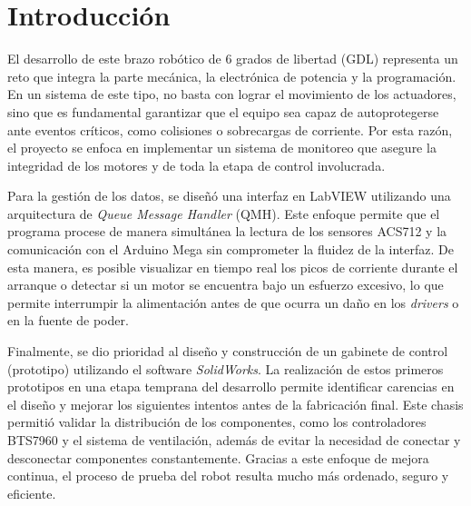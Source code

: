 \chapter{Introducción}
\lineaLateral

El desarrollo de este brazo robótico de 6 grados de libertad (GDL) representa un reto que integra la parte mecánica, la electrónica de potencia y la programación. En un sistema de este tipo, no basta con lograr el movimiento de los actuadores, sino que es fundamental garantizar que el equipo sea capaz de autoprotegerse ante eventos críticos, como colisiones o sobrecargas de corriente. Por esta razón, el proyecto se enfoca en implementar un sistema de monitoreo que asegure la integridad de los motores y de toda la etapa de control involucrada.

Para la gestión de los datos, se diseñó una interfaz en LabVIEW utilizando una arquitectura de \textit{Queue Message Handler} (QMH). Este enfoque permite que el programa procese de manera simultánea la lectura de los sensores ACS712 y la comunicación con el Arduino Mega sin comprometer la fluidez de la interfaz. De esta manera, es posible visualizar en tiempo real los picos de corriente durante el arranque o detectar si un motor se encuentra bajo un esfuerzo excesivo, lo que permite interrumpir la alimentación antes de que ocurra un daño en los \textit{drivers} o en la fuente de poder.

Finalmente, se dio prioridad al diseño y construcción de un gabinete de control (prototipo) utilizando el software \textit{SolidWorks}. La realización de estos primeros prototipos en una etapa temprana del desarrollo permite identificar carencias en el diseño y mejorar los siguientes intentos antes de la fabricación final. Este chasis permitió validar la distribución de los componentes, como los controladores BTS7960 y el sistema de ventilación, además de evitar la necesidad de conectar y desconectar componentes constantemente. Gracias a este enfoque de mejora continua, el proceso de prueba del robot resulta mucho más ordenado, seguro y eficiente.